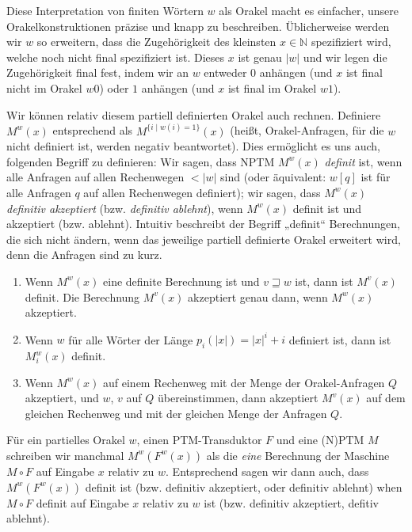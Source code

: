 Diese Interpretation von finiten Wörtern $w$ als Orakel macht es einfacher, unsere Orakelkonstruktionen präzise und knapp zu beschreiben. Üblicherweise werden wir $w$ so erweitern, dass die Zugehörigkeit des kleinsten $x\in\mathbb N$ spezifiziert wird, welche noch nicht final spezifiziert ist. Dieses $x$ ist genau $|w|$ und wir legen die Zugehörigkeit final fest, indem wir an $w$ entweder $0$ anhängen (und $x$ ist final nicht im Orakel $w0$) oder $1$ anhängen (und $x$ ist final im Orakel $w1$).


Wir können relativ diesem partiell definierten Orakel auch rechnen. Definiere $M^w(x)$ entsprechend als $M^{\{i\mid w(i)=1\}}(x)$ (heißt, Orakel-Anfragen, für die $w$ nicht definiert ist, werden negativ beantwortet).
Dies ermöglicht es uns auch, folgenden Begriff zu definieren: Wir sagen, dass NPTM $M^w(x)$ \emph{definit} ist, wenn alle Anfragen auf allen Rechenwegen $<|w|$ sind (oder äquivalent: $w[q]$ ist für alle Anfragen $q$ auf allen Rechenwegen definiert); wir sagen, dass $M^w(x)$ \emph{definitiv akzeptiert} (bzw. \emph{definitiv ablehnt}), wenn $M^w(x)$ definit ist und akzeptiert (bzw. ablehnt). Intuitiv beschreibt der Begriff „definit“ Berechnungen, die sich nicht ändern, wenn das jeweilige partiell definierte Orakel erweitert wird, denn die Anfragen sind zu kurz.
\begin{observation}\label{obs:partialoracles}
    \begin{enumerate}
        \item Wenn $M^w(x)$ eine definite Berechnung ist und $v\sqsupseteq w$ ist, dann ist $M^v(x)$ definit. Die Berechnung $M^v(x)$ akzeptiert genau dann, wenn $M^w(x)$ akzeptiert.
        \item Wenn $w$ für alle Wörter der Länge $p_i(|x|)=|x|^i+i$ definiert ist, dann ist $M_i^w(x)$ definit.
        \item Wenn $M^w(x)$ auf einem Rechenweg mit der Menge der Orakel-Anfragen $Q$ akzeptiert, und $w$, $v$ auf $Q$ übereinstimmen, dann akzeptiert $M^v(x)$ auf dem gleichen Rechenweg und mit der gleichen Menge der Anfragen $Q$.
    \end{enumerate}
\end{observation}

Für ein partielles Orakel $w$, einen PTM-Transduktor $F$ und eine (N)PTM $M$ schreiben wir manchmal $M^w(F^w(x))$ als die \emph{eine} Berechnung der Maschine $M\circ F$ auf Eingabe $x$ relativ zu $w$.
Entsprechend sagen wir dann auch, dass $M^w(F^w(x))$ definit ist (bzw. definitiv akzeptiert, oder definitiv ablehnt) when $M\circ F$ definit auf Eingabe $x$ relativ zu $w$ ist (bzw. definitiv akzeptiert, defitiv ablehnt).

